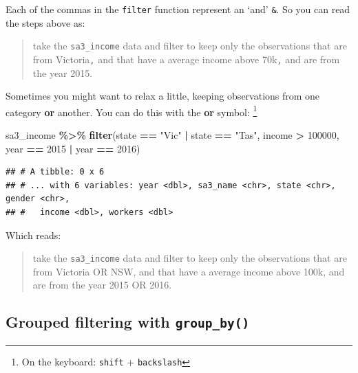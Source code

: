 \documentclass[
]{book}
\newenvironment{Shaded}{\begin{snugshade}}{\end{snugshade}}
\newcommand{\DecValTok}[1]{\textcolor[rgb]{0.00,0.00,0.81}{#1}}
\newcommand{\KeywordTok}[1]{\textcolor[rgb]{0.13,0.29,0.53}{\textbf{#1}}}
\newcommand{\NormalTok}[1]{#1}
\newcommand{\OperatorTok}[1]{\textcolor[rgb]{0.81,0.36,0.00}{\textbf{#1}}}
\newcommand{\StringTok}[1]{\textcolor[rgb]{0.31,0.60,0.02}{#1}}
\begin{document}
Each of the commas in the \texttt{filter} function represent an `and' \texttt{\&}. So you can read the steps above as:

\begin{quote}
take the \texttt{sa3\_income} data and filter to keep only the observations that are from Victoria\texttt{,} and that have a average income above 70k\texttt{,} and are from the year 2015.
\end{quote}

Sometimes you might want to relax a little, keeping observations from one category \textbf{or} another. You can do this with the \textbf{or} symbol: \texttt{\textbar{}}\footnote{On the keyboard: \texttt{shift} + \texttt{backslash}}

\begin{Shaded}
\begin{Highlighting}[]
\NormalTok{sa3\_income }\OperatorTok{\%\textgreater{}\%}\StringTok{ }
\StringTok{  }\KeywordTok{filter}\NormalTok{(state }\OperatorTok{==}\StringTok{ "Vic"} \OperatorTok{|}\StringTok{ }\NormalTok{state }\OperatorTok{==}\StringTok{ "Tas"}\NormalTok{,}
\NormalTok{         income }\OperatorTok{\textgreater{}}\StringTok{ }\DecValTok{100000}\NormalTok{,}
\NormalTok{         year }\OperatorTok{==}\StringTok{ }\DecValTok{2015} \OperatorTok{|}\StringTok{ }\NormalTok{year }\OperatorTok{==}\StringTok{ }\DecValTok{2016}\NormalTok{)}
\end{Highlighting}
\end{Shaded}

\begin{verbatim}
## # A tibble: 0 x 6
## # ... with 6 variables: year <dbl>, sa3_name <chr>, state <chr>, gender <chr>,
## #   income <dbl>, workers <dbl>
\end{verbatim}

Which reads:

\begin{quote}
take the \texttt{sa3\_income} data and filter to keep only the observations that are from Victoria OR NSW, and that have a average income above 100k, and are from the year 2015 OR 2016.
\end{quote}

\hypertarget{grouped-filtering-with-group_by}{%
\subsection{\texorpdfstring{Grouped filtering with \texttt{group\_by()}}{Grouped filtering with group\_by()}}\label{grouped-filtering-with-group_by}}
\end{document}
